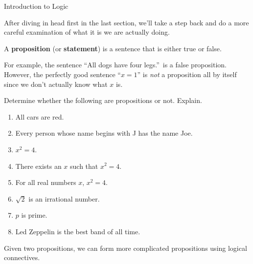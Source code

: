 \begin{section}{Introduction to Logic}

After diving in head first in the last section, we'll take a step back and do a more careful examination of what it is we are actually doing.

\begin{definition}
A \textbf{proposition} (or \textbf{statement}) is a sentence that is either true or false.
\end{definition}

For example, the sentence ``All dogs have four legs.''~is a false proposition.  However, the perfectly good sentence ``$x=1$'' is \emph{not} a proposition all by itself since we don't actually know what $x$ is.

\begin{exercise} Determine whether the following are propositions or not. Explain.
\begin{enumerate}[label=\textrm{(\alph*)}]
\item All cars are red.
\item Every person whose name begins with J has the name Joe.
\item $x^2=4$.
\item There exists an $x$ such that $x^2=4$.
\item For all real numbers $x$, $x^2=4$.
\item $\sqrt{2}$ is an irrational number.
\item $p$ is prime.
\item Led Zeppelin is the best band of all time.
\end{enumerate}
\end{exercise}

Given two propositions, we can form more complicated propositions using logical connectives.


\end{section}
